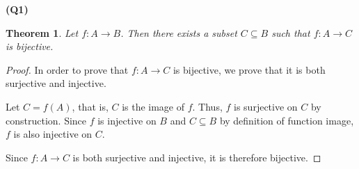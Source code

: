 \documentclass[12pt, a4paper]{article}
\newtheorem{theorem}{Theorem}
\begin{document}
\noindent\textbf{(Q1)}

\begin{theorem}
    Let $f\colon A \to B$. Then there exists a subset $C \subseteq B$ such that
    $f\colon A \to C$ is bijective.
\end{theorem}

\begin{proof}
    In order to prove that $f \colon A \to C$ is bijective, we prove that it is
    both surjective and injective.
    
    Let $C = f(A)$, that is, $C$ is the image of $f$. Thus, $f$ is surjective 
    on $C$ by construction. Since $f$ is injective on $B$ and $C \subseteq B$ by 
    definition of function image, $f$ is also injective on $C$.

    Since $f \colon A \to C$ is both surjective and injective, it is therefore
    bijective.
\end{proof}
\end{document}
